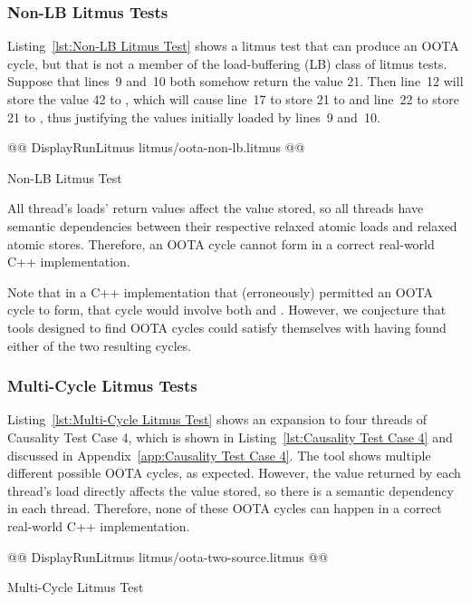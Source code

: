 \documentclass[10]{article}
\begin{document}
\subsubsection{Non-LB Litmus Tests}
\label{app:Non-LB Litmus Tests}

Listing~\ref{lst:Non-LB Litmus Test}
shows a litmus test that can produce an OOTA cycle, but that is not
a member of the load-buffering (LB) class of litmus tests.
Suppose that lines~9 and~10 both somehow return the value 21.
Then line~12 will store the value 42 to , which will cause
line~17 to store 21 to  and line~22 to store 21 to ,
thus justifying the values initially loaded by lines~9 and~10.

\begin{listing}[tbp]
@@ DisplayRunLitmus litmus/oota-non-lb.litmus @@
\caption{Non-LB Litmus Test}
\label{lst:Non-LB Litmus Test}
\end{listing}

All thread's loads' return values affect the value stored, so all
threads have semantic dependencies between their respective relaxed
atomic loads and relaxed atomic stores.
Therefore, an OOTA cycle cannot form in a correct real-world C++
implementation.

Note that in a C++ implementation that (erroneously) permitted an OOTA
cycle to form, that cycle would involve both  and .
However, we conjecture that tools designed to find OOTA cycles could
satisfy themselves with having found either of the two resulting cycles.

\subsubsection{Multi-Cycle Litmus Tests}
\label{app:Multi-Cycle Litmus Tests}

Listing~\ref{lst:Multi-Cycle Litmus Test}
shows an expansion to four threads of Causality Test Case 4, which is shown in
Listing~\ref{lst:Causality Test Case 4}
and discussed in
Appendix~\ref{app:Causality Test Case 4}.
The  tool shows multiple different possible OOTA cycles,
as expected.
However, the value returned by each thread's load directly affects the
value stored, so there is a semantic dependency in each thread.
Therefore, none of these OOTA cycles can happen in a correct real-world
C++ implementation.

\begin{listing}[tbp]
@@ DisplayRunLitmus litmus/oota-two-source.litmus @@
\caption{Multi-Cycle Litmus Test}
\label{lst:Multi-Cycle Litmus Test}
\end{listing}
\end{document}
